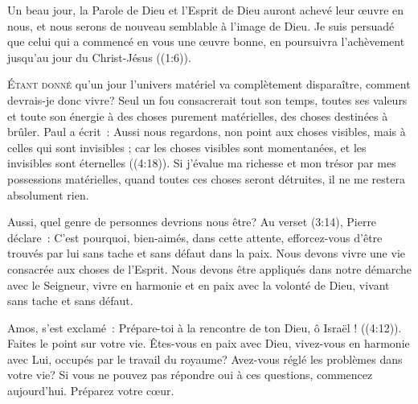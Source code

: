 Un beau jour, la Parole de Dieu et l'Esprit de Dieu auront achevé leur \oe{}uvre
 en nous, et nous serons de nouveau semblable à l'image de Dieu.
 \og Je suis persuadé que celui qui a commencé en vous une œuvre bonne,
 en poursuivra l'achèvement jusqu'au jour du Christ-Jésus \fg{}
 ((1:6)).

\dvrule






\lettrine{É}{tant donné} qu'un jour l'univers matériel va complètement
 disparaître, comment devrais-je donc vivre? Seul un fou consacrerait
 tout son temps, toutes ses valeurs et toute son énergie à des choses purement
 matérielles, des choses destinées à brûler. Paul a écrit~: 
 \og Aussi nous regardons, non point aux choses visibles,
 mais à celles qui sont invisibles ; car les choses visibles sont momentanées,
 et les invisibles sont éternelles \fg{} ((4:18)).
 Si j'évalue ma richesse et mon trésor par mes possessions matérielles,
 quand toutes ces choses seront détruites, il ne me restera absolument rien.

Aussi, quel genre de personnes devrions nous être? Au verset
 (3:14),
 Pierre déclare~: 
 \og C'est pourquoi, bien-aimés, dans cette attente,
 efforcez-vous d'être trouvés par lui sans tache et sans défaut
 dans la paix. \fg{}
 Nous devons vivre une vie consacrée aux choses de l'Esprit.
 Nous devons être appliqués dans notre démarche avec le Seigneur,
 vivre en harmonie et en paix avec la volonté de Dieu,
 vivant sans tache et sans défaut.


Amos, s'est exclamé~: 
 \og Prépare-toi à la rencontre de ton Dieu, ô Israël ! \fg{}
 ((4:12)).
 Faites le point sur votre vie. Êtes-vous en paix avec Dieu,
 vivez-vous en harmonie avec Lui, occupés par le travail du royaume?
 Avez-vous réglé les problèmes dans votre vie? Si vous ne pouvez pas répondre
 \og oui \fg{} à ces questions, commencez aujourd'hui. Préparez votre c\oe{}ur.

